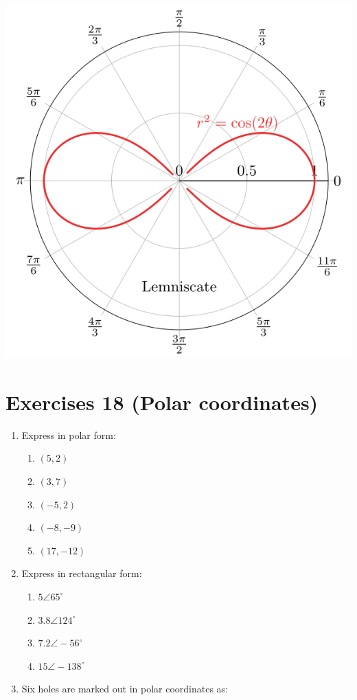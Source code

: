 \documentclass[
  12pt,
  oneside]{book}
\providecommand{\tightlist}{%
  \setlength{\itemsep}{0pt}\setlength{\parskip}{0pt}}
\theoremstyle{definition}
\theoremstyle{definition}
\theoremstyle{definition}
\theoremstyle{definition}
\theoremstyle{remark}
\begin{document}
\begin{center}\includegraphics{t18-polar-pics-8} \end{center}

\chapter*{Exercises 18 (Polar coordinates)}\label{exercises-18-polar-coordinates}

\begin{enumerate}
\def\labelenumi{\arabic{enumi}.}
\item
  Express in polar form:

  \begin{enumerate}
  \def\labelenumii{\roman{enumii})}
  \tightlist
  \item
    \((5, 2)\)
  \item
    \((3, 7)\)
  \item
    \((-5, 2)\)
  \item
    \((-8, -9)\)
  \item
    \((17, -12)\)
  \end{enumerate}
\item
  Express in rectangular form:

  \begin{enumerate}
  \def\labelenumii{\roman{enumii})}
  \tightlist
  \item
    \(5 \angle 65^\circ\)
  \item
    \(3.8 \angle 124^\circ\)
  \item
    \(7.2 \angle -56^\circ\)
  \item
    \(15 \angle -138^\circ\)
  \end{enumerate}
\item
  Six holes are marked out in polar coordinates as:
\end{enumerate}
\end{document}
